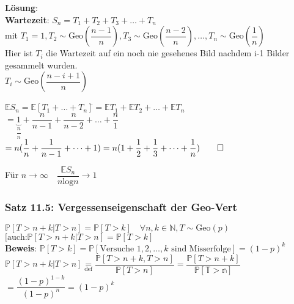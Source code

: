 \textbf{Lösung}:\\
\textbf{Wartezeit}: $S_n = T_1+T_2+T_3+\dots+T_n$\smallskip\\
mit $T_1 =1, T_2 \sim \text{Geo}(\dfrac{n-1}{n}),T_3\sim \text{Geo}(\dfrac{n-2}{n}),\dots,T_n\sim \text{Geo}(\dfrac{1}{n})$\medskip\\
Hier ist $T_i$ die Wartezeit auf ein noch nie gesehenes Bild nachdem i-1 Bilder gesammelt wurden.\smallskip\\
$T_i \sim \text{Geo}(\dfrac{n-i+1}{n})$\smallskip\\
\begin{tabbing}
	$\mathds{E}S_n = \mathds{E}[T_1+\dots+T_n]$\=$ = \mathds{E}T_1+\mathds{E}T_2+\dots+\mathds{E}T_n$\\
	\> $= \underbrace{1}_{\dfrac{n}{n}}+\dfrac{n}{n-1}+\dfrac{n}{n-2}+\dots+\dfrac{n}{1}$\\
	\>$=n(\dfrac{1}{n}+\dfrac{1}{n-1}+\dots+1)= n(1+\dfrac{1}{2}+\dfrac{1}{3}+\dots+\dfrac{1}{n}) \qed$
\end{tabbing}
Für $n \rightarrow\infty \quad \dfrac{\mathds{E}S_n}{n \text{log}n}\rightarrow1$
\subsubsection{Satz 11.5: Vergessenseigenschaft der Geo-Vert}
$\mathds{P}[T>n+k\vert T>n]=\mathds{P}[T>k] \quad \forall n,k \in \mathds{N}, T \sim \text{Geo}(p)$\\
$[\text{auch:}\mathds{P}[T>n+k\vert T>n]=\mathds{P}[T>k]$\medskip\\
\textbf{Beweis}: $\mathds{P}[T>k] = \mathds{P}[\text{Versuche } 1,2,\dots,k \text{ sind Misserfolge}]=(1-p)^k$\smallskip\\
$\mathds{P}[T>n+k\vert T>n]\underset{\text{def}}{=} \dfrac{\mathds{P}[T>n+k, T>n]}{\mathds{P}[T>n]} = \dfrac{\mathds{P}[T>n+k]}{\mathds{P[T>n]}}$\\$=\dfrac{(1-p)^{1-k}}{(1-p)^n}=(1-p)^k$



